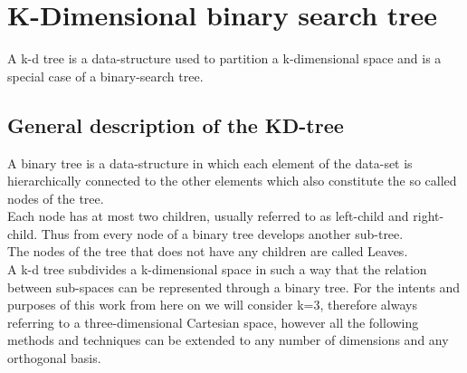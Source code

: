 \chapter{K-Dimensional binary search tree}\label{ch:3}
A k-d tree is a data-structure used to partition a k-dimensional space and is a special case of a binary-search tree.

\section{General description of the KD-tree}
A binary tree is a data-structure in which each element of the data-set is hierarchically connected to the other elements which also constitute the so called nodes of the tree.\\
Each node has at most two children, usually referred to as left-child and right-child. Thus from every node of a binary tree develops another sub-tree. \\
The nodes of the tree that does not have any children are called Leaves.\\
A k-d tree subdivides a k-dimensional space in such a way that the relation between sub-spaces can be represented through a binary tree.
For the intents and purposes of this work from here on we will consider k=3, therefore always referring to a three-dimensional Cartesian space, however all the following methods and techniques can be extended to any number of dimensions and any orthogonal basis.
  
